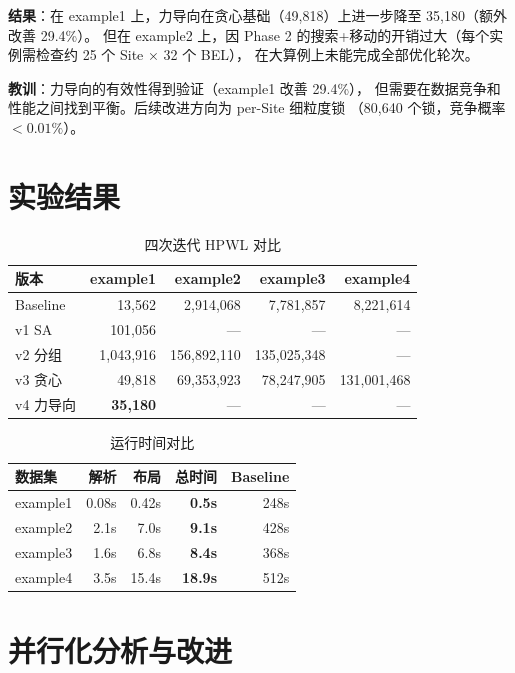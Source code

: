 \documentclass[10.5pt,compsoc]{CjC}
\theoremstyle{mystyle}
\begin{document}
\textbf{结果}：在 example1 上，力导向在贪心基础（49,818）上进一步降至 35,180（额外改善 29.4\%）。
但在 example2 上，因 Phase 2 的搜索+移动的开销过大（每个实例需检查约 25 个 Site × 32 个 BEL），
在大算例上未能完成全部优化轮次。

\textbf{教训}：力导向的有效性得到验证（example1 改善 29.4\%），
但需要在数据竞争和性能之间找到平衡。后续改进方向为 per-Site 细粒度锁
（80,640 个锁，竞争概率 $<0.01\%$）。

\section{实验结果}

\begin{table}[H]
\centering
\caption{四次迭代 HPWL 对比}
\scriptsize
\setlength{\tabcolsep}{2pt}
\begin{tabular}{@{}lrrrr@{}}
\toprule
版本 & example1 & example2 & example3 & example4 \\
\midrule
Baseline & 13,562 & 2,914,068 & 7,781,857 & 8,221,614 \\
v1 SA & 101,056 & --- & --- & --- \\
v2 分组 & 1,043,916 & 156,892,110 & 135,025,348 & --- \\
v3 贪心 & 49,818 & 69,353,923 & 78,247,905 & 131,001,468 \\
v4 力导向 & \textbf{35,180} & --- & --- & --- \\
\bottomrule
\end{tabular}
\end{table}

\begin{table}[H]
\centering
\caption{运行时间对比}
\scriptsize
\setlength{\tabcolsep}{2pt}
\begin{tabular}{@{}lrrrr@{}}
\toprule
数据集 & 解析 & 布局 & 总时间 & Baseline \\
\midrule
example1 & 0.08s & 0.42s & \textbf{0.5s} & 248s \\
example2 & 2.1s & 7.0s & \textbf{9.1s} & 428s \\
example3 & 1.6s & 6.8s & \textbf{8.4s} & 368s \\
example4 & 3.5s & 15.4s & \textbf{18.9s} & 512s \\
\bottomrule
\end{tabular}
\end{table}

\section{并行化分析与改进}
\end{document}
